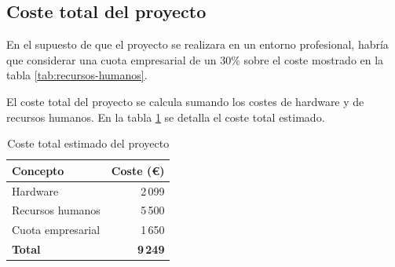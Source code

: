 \subsection{Coste total del proyecto}

En el supuesto de que el proyecto se realizara en un entorno profesional, habría que considerar una cuota empresarial de un $30\%$ sobre el coste mostrado en la tabla \ref{tab:recursos-humanos}.

El coste total del proyecto se calcula sumando los costes de hardware y de recursos humanos. En la tabla \ref{tab:coste-total} se detalla el coste total estimado.

\begin{table}[!ht]
      \centering
      \begin{tabular}{|l|r|}
            \hline
            \textbf{Concepto} & \textbf{Coste (€)} \\
            \hline
            Hardware          & 2\,099             \\
            Recursos humanos  & 5\,500             \\
            Cuota empresarial & 1\,650             \\
            \hline
            \textbf{Total}    & \textbf{9\,249}    \\
            \hline
      \end{tabular}
      \caption{Coste total estimado del proyecto}
      \label{tab:coste-total}
\end{table}